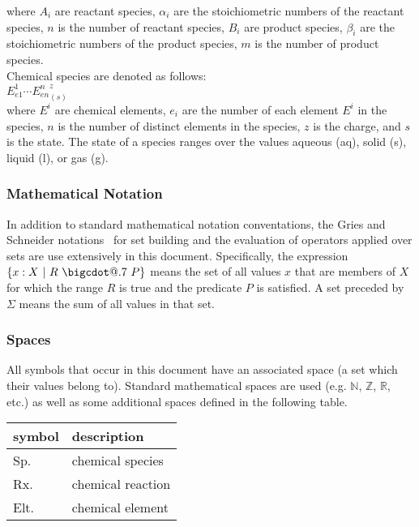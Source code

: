 \documentclass[12pt]{article}
\makeatletter
\newcommand*\bigcdot{\mathpalette\bigcdot@{.7}}
\newcommand*\bigcdot@[2]
  {\mathbin{\vcenter{\hbox{\scalebox{#2}{$\m@th#1\bullet$}}}}}
\makeatother
\begin{document}
where $A_i$ are reactant species, $\alpha_i$ are the stoichiometric numbers
of the reactant species, $n$ is the number of reactant species, $B_i$ are product species,
$\beta_i$ are the stoichiometric numbers of the product species, $m$ is the number of
product species.\\

\noindent
Chemical species are denoted as follows:\\

${{E}^1_{e1}}\cdots{{E}^n_{en}}^{z}_{(s)}$\\

where $E^i$ are chemical elements, $e_i$ are the number of each element $E^i$ in
the species, $n$ is the number of distinct elements in the species, $z$ is the
charge, and $s$ is the state.  The state of a species ranges over the values
aqueous (aq), solid (s), liquid (l), or gas (g).

\subsubsection{Mathematical Notation}
In addition to standard mathematical notation conventations, the Gries and Schneider 
notations~\cite{GS1993} for 
set building and the evaluation of
operators applied over sets are use extensively in this document.  
Specifically, the expression $\{x: X~|~R~\bigcdot~P\}$ means the set of all values $x$ 
that are members of $X$ for which the range $R$ is true and the predicate $P$ is satisfied.  
A set preceded by $\Sigma$ means the sum of all values in that set.

\subsubsection{Spaces}
All symbols that occur in this document have an associated space (a set which their values 
belong to).  Standard mathematical spaces are used (e.g. $\mathbb{N}$, $\mathbb{Z}$, 
$\mathbb{R}$, etc.) as well as some additional spaces defined in the following table. 
~\newline

\renewcommand{\arraystretch}{1.2}
  \noindent \begin{tabular}{l l} 
    \toprule		
    \textbf{symbol} & \textbf{description}\\
    \midrule 
    Sp. & chemical species \\
    Rx. & chemical reaction \\
    Elt. & chemical element \\
    \bottomrule
  \end{tabular}
\end{document}
